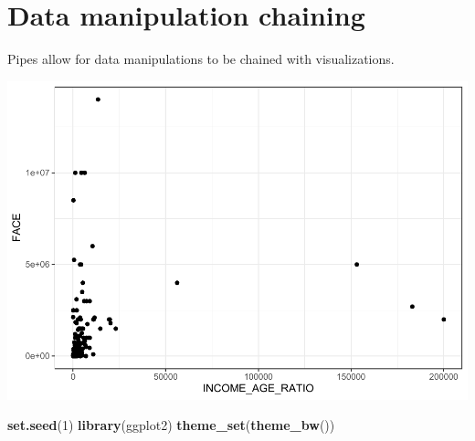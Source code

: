 \documentclass[openany]{book}
\newenvironment{Shaded}{\begin{snugshade}}{\end{snugshade}}
\newcommand{\DataTypeTok}[1]{\textcolor[rgb]{0.13,0.29,0.53}{#1}}
\newcommand{\DecValTok}[1]{\textcolor[rgb]{0.00,0.00,0.81}{#1}}
\newcommand{\KeywordTok}[1]{\textcolor[rgb]{0.13,0.29,0.53}{\textbf{#1}}}
\newcommand{\NormalTok}[1]{#1}
\newcommand{\OperatorTok}[1]{\textcolor[rgb]{0.81,0.36,0.00}{\textbf{#1}}}
\newcommand{\StringTok}[1]{\textcolor[rgb]{0.31,0.60,0.02}{#1}}
\begin{document}
\hypertarget{data-manipulation-chaining}{%
\section{Data manipulation chaining}\label{data-manipulation-chaining}}

Pipes allow for data manipulations to be chained with visualizations.

\begin{Shaded}
\end{Shaded}

\includegraphics{04-visualization_files/figure-latex/unnamed-chunk-7-1.pdf}

\begin{Shaded}
\begin{Highlighting}[]
\KeywordTok{set.seed}\NormalTok{(}\DecValTok{1}\NormalTok{)}
\KeywordTok{library}\NormalTok{(ggplot2)}
\KeywordTok{theme_set}\NormalTok{(}\KeywordTok{theme_bw}\NormalTok{())}
\end{Highlighting}
\end{Shaded}
\end{document}
